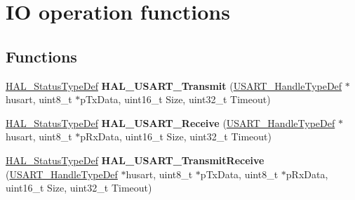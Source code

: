 \hypertarget{group___u_s_a_r_t___exported___functions___group2}{}\section{IO operation functions}
\label{group___u_s_a_r_t___exported___functions___group2}
\subsection*{Functions}
\begin{DoxyCompactItemize}
\item 
\mbox{\label{group___u_s_a_r_t___exported___functions___group2_gaa80425d3a8fa74a17f74cb03a3c2ad05}} 
\hyperlink{stm32f0xx__hal__def_8h_a63c0679d1cb8b8c684fbb0632743478f}{H\+A\+L\+\_\+\+Status\+Type\+Def} {\bfseries H\+A\+L\+\_\+\+U\+S\+A\+R\+T\+\_\+\+Transmit} (\hyperlink{struct_u_s_a_r_t___handle_type_def}{U\+S\+A\+R\+T\+\_\+\+Handle\+Type\+Def} $\ast$husart, uint8\+\_\+t $\ast$p\+Tx\+Data, uint16\+\_\+t Size, uint32\+\_\+t Timeout)
\item 
\mbox{\label{group___u_s_a_r_t___exported___functions___group2_ga1da8a5ce515c18b9960d366812bf737e}} 
\hyperlink{stm32f0xx__hal__def_8h_a63c0679d1cb8b8c684fbb0632743478f}{H\+A\+L\+\_\+\+Status\+Type\+Def} {\bfseries H\+A\+L\+\_\+\+U\+S\+A\+R\+T\+\_\+\+Receive} (\hyperlink{struct_u_s_a_r_t___handle_type_def}{U\+S\+A\+R\+T\+\_\+\+Handle\+Type\+Def} $\ast$husart, uint8\+\_\+t $\ast$p\+Rx\+Data, uint16\+\_\+t Size, uint32\+\_\+t Timeout)
\item 
\mbox{\label{group___u_s_a_r_t___exported___functions___group2_gad6da6800e21d17bd021f5d0cc068f271}} 
\hyperlink{stm32f0xx__hal__def_8h_a63c0679d1cb8b8c684fbb0632743478f}{H\+A\+L\+\_\+\+Status\+Type\+Def} {\bfseries H\+A\+L\+\_\+\+U\+S\+A\+R\+T\+\_\+\+Transmit\+Receive} (\hyperlink{struct_u_s_a_r_t___handle_type_def}{U\+S\+A\+R\+T\+\_\+\+Handle\+Type\+Def} $\ast$husart, uint8\+\_\+t $\ast$p\+Tx\+Data, uint8\+\_\+t $\ast$p\+Rx\+Data, uint16\+\_\+t Size, uint32\+\_\+t Timeout)
\item 
\mbox{\label{group___u_s_a_r_t___exported___functions___group2_gaee43a3d0faab6467aea5663f8b0e87b0}} 

\end{DoxyCompactItemize}
